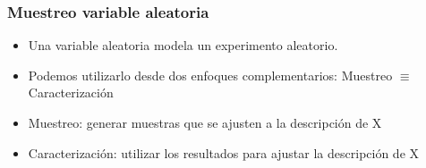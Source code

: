 \begin{frame}
\frametitle{Muestreo variable aleatoria}
  \begin{itemize}
    \item Una variable aleatoria modela un experimento aleatorio.
    \item Podemos utilizarlo desde dos enfoques complementarios: Muestreo $\equiv$ Caracterización
    \item Muestreo: generar muestras que se ajusten a la descripción de X
    \item Caracterización: utilizar los resultados para ajustar la descripción de X 
  \end{itemize}
\end{frame}

















